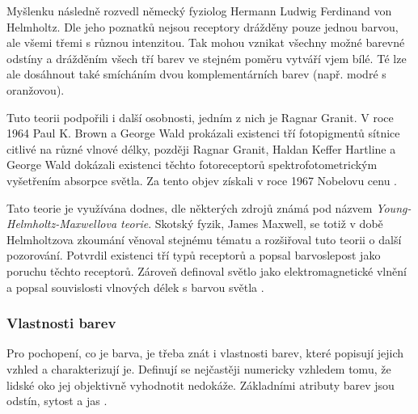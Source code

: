 Myšlenku následně rozvedl německý fyziolog Hermann Ludwig Ferdinand von Helmholtz. Dle jeho poznatků nejsou receptory drážděny pouze jednou barvou,
ale všemi třemi s různou intenzitou. Tak mohou vznikat všechny možné barevné odstíny a drážděním všech tří barev ve stejném poměru vytváří vjem bílé.
Té lze ale dosáhnout také smícháním dvou komplementárních barev (např. modré s oranžovou).

Tuto teorii podpořili i další osobnosti, jedním z nich je Ragnar Granit. V roce 1964 Paul K. Brown a George Wald prokázali existenci tří fotopigmentů sítnice citlivé
na různé vlnové délky, později Ragnar Granit, Haldan Keffer Hartline a George Wald dokázali existenci těchto fotoreceptorů spektrofotometrickým vyšetřením
absorpce světla. Za tento objev získali v roce 1967 Nobelovu cenu \cite{vackova2013teorie}.

Tato teorie je využívána dodnes, dle některých zdrojů známá pod názvem \emph{Young-Helmholtz-Maxwellova teorie}. Skotský fyzik, James Maxwell, se totiž v době Helmholtzova zkoumání věnoval stejnému
tématu a rozšiřoval tuto teorii o další pozorování. Potvrdil existenci tří typů receptorů a popsal barvoslepost jako poruchu těchto receptorů. Zároveň definoval světlo jako
elektromagnetické vlnění a popsal souvislosti vlnových délek s barvou světla \cite{958782}.


\subsubsection{Vlastnosti barev}
Pro pochopení, co je barva, je třeba znát i vlastnosti barev, které popisují jejich vzhled a charakterizují je. Definují se nejčastěji numericky vzhledem tomu,
že lidské oko jej objektivně vyhodnotit nedokáže. Základními atributy barev jsou odstín, sytost a jas \cite{jelen2023vliv_barev}.

